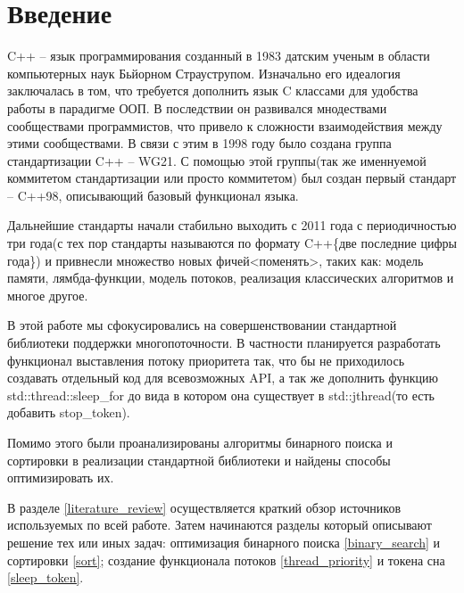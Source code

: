 \section{Введение}
\par{C++ -- язык программирования созданный в 1983 датским ученым в области компьютерных наук Бьйорном Страуструпом. Изначально его идеалогия заключалась в том, что требуется дополнить язык C классами для удобства работы в парадигме ООП. В последствии он развивался мнодествами сообществами программистов, что привело к сложности взаимодействия между этими сообществами. В связи с этим в 1998 году было создана группа стандартизации C++ -- WG21. С помощью этой группы(так же именнуемой коммитетом стандартизации или просто коммитетом) был создан первый стандарт -- C++98, описывающий базовый функционал языка.}
\par{Дальнейшие стандарты начали стабильно выходить с 2011 года с периодичностью три года(с тех пор стандарты называются по формату C++\{две последние цифры года\}) и привнесли множество новых фичей<поменять>, таких как: модель памяти, лямбда-функции, модель потоков, реализация классических алгоритмов и многое другое.}
\par{В этой работе мы сфокусировались на совершенствовании стандартной библиотеки поддержки многопоточности. В частности планируется разработать функционал выставления потоку приоритета так, что бы не приходилось создавать отдельный код для всевозможных API, а так же дополнить функцию std::thread::sleep\_for до вида в котором она существует в std::jthread(то есть добавить stop\_token).}
\par{Помимо этого были проанализированы алгоритмы бинарного поиска и сортировки в реализации стандартной библиотеки и найдены способы оптимизировать их.}
\par{В разделе \ref{literature_review} осуществляется краткий обзор источников используемых по всей работе. Затем начинаются разделы который описывают решение тех или иных задач: оптимизация бинарного поиска \ref{binary_search} и сортировки \ref{sort}; создание функционала потоков \ref{thread_priority} и токена сна \ref{sleep_token}.}
